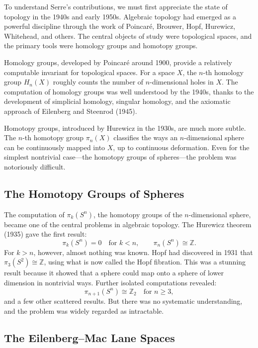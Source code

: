 To understand Serre's contributions, we must first appreciate the state of topology in the 1940s and early 1950s. Algebraic topology had emerged as a powerful discipline through the work of Poincaré, Brouwer, Hopf, Hurewicz, Whitehead, and others. The central objects of study were topological spaces, and the primary tools were homology groups and homotopy groups.


Homology groups, developed by Poincaré around 1900, provide a relatively computable invariant for topological spaces. For a space $X$, the $n$-th homology group $H_n(X)$ roughly counts the number of $n$-dimensional holes in $X$. The computation of homology groups was well understood by the 1940s, thanks to the development of simplicial homology, singular homology, and the axiomatic approach of Eilenberg and Steenrod (1945).

Homotopy groups, introduced by Hurewicz in the 1930s, are much more subtle. The $n$-th homotopy group $\pi_n(X)$ classifies the ways an $n$-dimensional sphere can be continuously mapped into $X$, up to continuous deformation. Even for the simplest nontrivial case---the homotopy groups of spheres---the problem was notoriously difficult.

\subsection{The Homotopy Groups of Spheres}

The computation of $\pi_k(S^n)$, the homotopy groups of the $n$-dimensional sphere, became one of the central problems in algebraic topology. The Hurewicz theorem (1935) gave the first result:
\[
\pi_k(S^n) = 0 \quad\text{for } k < n, \qquad \pi_n(S^n) \cong \mathbb{Z}.
\]
For $k > n$, however, almost nothing was known. Hopf had discovered in 1931 that $\pi_3(S^2) \cong \mathbb{Z}$, using what is now called the Hopf fibration. This was a stunning result because it showed that a sphere could map onto a sphere of lower dimension in nontrivial ways. Further isolated computations revealed:
\[
\pi_{n+1}(S^n) \cong \mathbb{Z}_2 \quad\text{for } n \geq 3,
\]
and a few other scattered results. But there was no systematic understanding, and the problem was widely regarded as intractable.

\subsection{The Eilenberg--Mac Lane Spaces}

